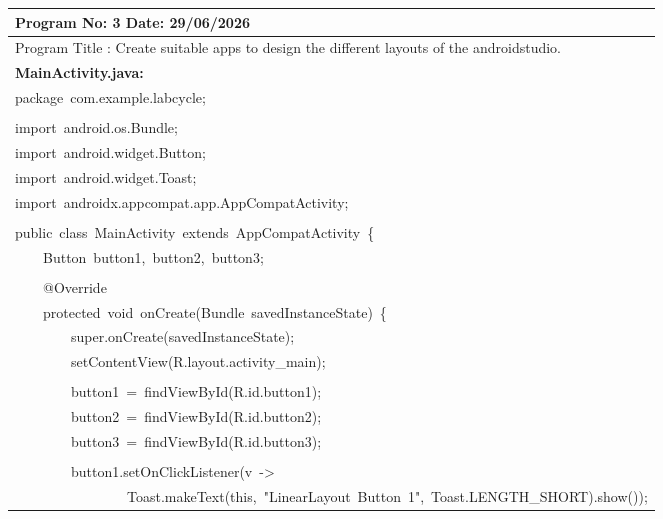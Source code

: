 \documentclass[a4paper,12pt]{article}
\begin{document}
\newpage

\noindent\begingroup
\renewcommand{\arraystretch}{1.1}
\begin{longtable}{|p{}|}
\hline\endfirsthead\hline\endhead\hline\endfoot\hline\endlastfoot
\rule{0pt}{13pt}Program No: 3 \hfill Date: 29/06/2026 \\
\hline
\rule{0pt}{13pt}Program Title : Create suitable apps to design the different layouts of the androidstudio. \\
\hline
\rule{0pt}{13pt}\textbf{MainActivity.java:} \\
\hline
{\ttfamily\small package\ com.example.labcycle;} \\
\strut \\
{\ttfamily\small import\ android.os.Bundle;} \\
{\ttfamily\small import\ android.widget.Button;} \\
{\ttfamily\small import\ android.widget.Toast;} \\
{\ttfamily\small import\ androidx.appcompat.app.AppCompatActivity;} \\
\strut \\
{\ttfamily\small public\ class\ MainActivity\ extends\ AppCompatActivity\ \{} \\
{\ttfamily\small \ \ \ \ Button\ button1,\ button2,\ button3;} \\
\strut \\
{\ttfamily\small \ \ \ \ @Override} \\
{\ttfamily\small \ \ \ \ protected\ void\ onCreate(Bundle\ savedInstanceState)\ \{} \\
{\ttfamily\small \ \ \ \ \ \ \ \ super.onCreate(savedInstanceState);} \\
{\ttfamily\small \ \ \ \ \ \ \ \ setContentView(R.layout.activity\_main);} \\
\strut \\
{\ttfamily\small \ \ \ \ \ \ \ \ button1\ =\ findViewById(R.id.button1);} \\
{\ttfamily\small \ \ \ \ \ \ \ \ button2\ =\ findViewById(R.id.button2);} \\
{\ttfamily\small \ \ \ \ \ \ \ \ button3\ =\ findViewById(R.id.button3);} \\
\strut \\
{\ttfamily\small \ \ \ \ \ \ \ \ button1.setOnClickListener(v\ -\textgreater{}} \\
{\ttfamily\small \ \ \ \ \ \ \ \ \ \ \ \ \ \ \ \ Toast.makeText(this,\ "LinearLayout\ Button\ 1",\ Toast.LENGTH\_SHORT).show());} \\

\end{longtable}
\end{document}
